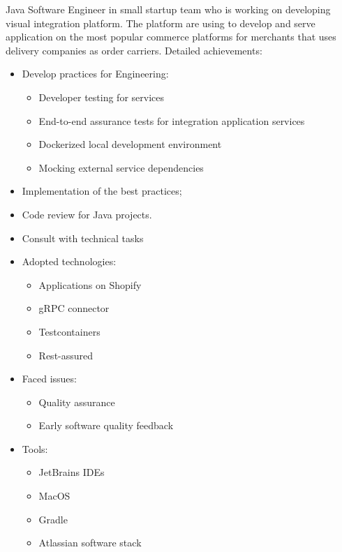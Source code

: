 \documentclass[11pt, a4paper]{moderncv}
\begin{document}
{
Java Software Engineer in small startup team who is working on developing visual integration platform. The platform are using to develop and serve application on the most popular commerce platforms for merchants that uses delivery companies as order carriers.
\newline{}
Detailed achievements:
\begin{itemize}
\item Develop practices for Engineering:
\begin{itemize}
\item Developer testing for services
\item End-to-end assurance tests for integration application services
\item Dockerized local development environment
\item Mocking external service dependencies
\end{itemize}
\item Implementation of the best practices;
\item Code review for Java projects.
\item Consult with technical tasks
\item Adopted technologies:
\begin{itemize}
\item Applications on Shopify
\item gRPC connector
\item Testcontainers
\item Rest-assured
\end{itemize}
\item Faced issues:
\begin{itemize}
\item Quality assurance
\item Early software quality feedback
\end{itemize}
\item Tools:
\begin{itemize}
\item JetBrains IDEs
\item MacOS
\item Gradle
\item Atlassian software stack
\end{itemize}
\end{itemize}
}
\end{document}
